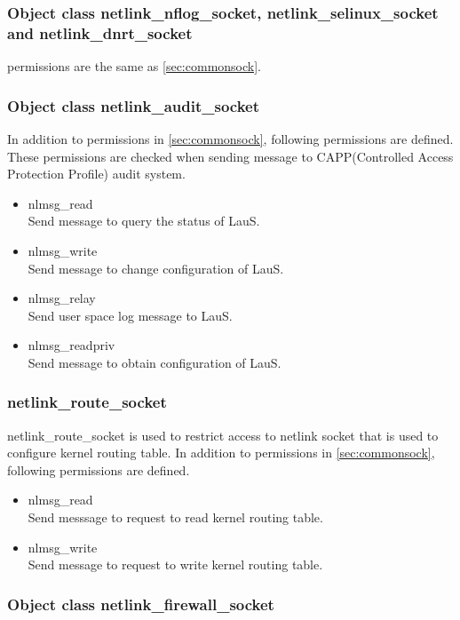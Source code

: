 \documentclass{article}
\begin{document}
\subsubsection{Object class netlink\_nflog\_socket, netlink\_selinux\_socket and netlink\_dnrt\_socket}
permissions are the same as \ref{sec:commonsock}.

\subsubsection{Object class netlink\_audit\_socket}
In addition to permissions in \ref{sec:commonsock}, following permissions are defined. These permissions are checked when sending
message to CAPP(Controlled Access Protection Profile)\cite{capp} audit system.
\begin{itemize}
 \item  nlmsg\_read\\
	Send message  to query the status of LauS.
 \item  nlmsg\_write\\
	Send message to change configuration of LauS.
 \item  nlmsg\_relay\\
        Send user space log  message to LauS. 
 \item nlmsg\_readpriv\\
	Send message to obtain configuration of LauS.
\end{itemize}


\subsubsection{netlink\_route\_socket}
netlink\_route\_socket is used to restrict access to netlink socket that
is used to configure kernel routing table. In addition to permissions in \ref{sec:commonsock}, following permissions are defined.
\begin{itemize}
 \item nlmsg\_read\\
       Send messsage to request to read kernel routing table.
 \item nlmsg\_write\\
       Send message to request to write kernel routing table.
\end{itemize}

\subsubsection{Object class netlink\_firewall\_socket }
\end{document}
